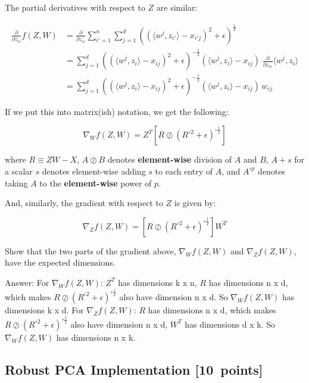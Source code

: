 \documentclass{article}
\newcommand{\blu}[1]{{\textcolor{blu}{#1}}}
\newcommand{\gre}[1]{\textcolor{gre}{#1}}
\newcommand\ans[1]{\par\gre{Answer: #1}}
\let\ask\blu
\newcommand\pts[1]{\textcolor{pointscolour}{[#1~points]}}
\begin{document}
The partial derivatives with respect to $Z$ are similar:

\begin{align*}
\frac{\partial}{\partial z_{ic}} f(Z,W)
  &= \frac{\partial}{\partial z_{ic}} \sum_{i'=1}^n \sum_{j=1}^d  \left( (\langle w^j, z_{i'}\rangle - x_{i'j})^2 + \epsilon \right)^{\frac12}\\
  &= \sum_{j=1}^d  \left( (\langle w^j, z_{i}\rangle - x_{ij})^2 + \epsilon \right)^{-\frac12}   (\langle w^j, z_{i}\rangle - x_{ij}) \; \frac{\partial}{\partial z_{ic}} \langle w^j, z_i\rangle \\
  &= \sum_{j=1}^d  \left( (\langle w^j, z_i\rangle - x_{ij})^2 + \epsilon \right)^{-\frac12}  (\langle w^j, z_i\rangle - x_{ij}) \, w_{cj}
\end{align*}

If we put this into matrix(ish) notation, we get the following:

\[
\nabla_W f(Z,W) = Z^T \left[ R \oslash \left(R^{\circ 2} + \epsilon\right)^{\circ \frac12}  \right]
\]

where $R\equiv ZW-X$,
$A \oslash B$ denotes \textbf{element-wise} division of $A$ and $B$,
$A + s$ for a scalar $s$ denotes element-wise adding $s$ to each entry of $A$,
and $A^{\circ p}$ denotes taking $A$ to the \textbf{element-wise} power of $p$.

And, similarly, the gradient with respect to $Z$ is given by:

\[
\nabla_Z f(Z,W) = \left[ R \oslash \left(R^{\circ 2} + \epsilon\right)^{\circ \frac12} \right] W^T
\]

\ask{Show that the two parts of the gradient above, $\nabla_W f(Z,W)$ and $\nabla_Z f(Z,W)$, have the expected dimensions.}

\ans{\newline 
For $\nabla_W f(Z,W)$: $Z^T$ has dimensions k x n, $R$ has dimensions n x d, which makes $R \oslash \left(R^{\circ 2} + \epsilon\right)^{\circ \frac12}$ also have dimension n x d. So $\nabla_W f(Z,W)$ has dimensions k x d. 
\newline 
\newline
For $\nabla_Z f(Z,W)$: $R$ has dimensions n x d, which makes $R \oslash \left(R^{\circ 2} + \epsilon\right)^{\circ \frac12}$ also have dimension n x d,
$W^T$ has dimensions d x k. So $\nabla_W f(Z,W)$ has dimensions n x k. 
}
\newpage
\subsection{Robust PCA Implementation \pts{10}}
\end{document}
